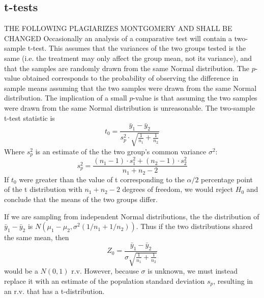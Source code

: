\documentclass[11pt,a4paper,article]{memoir} %
\begin{document}
\subsection*{t-tests}
THE FOLLOWING PLAGIARIZES MONTGOMERY AND SHALL BE CHANGED
Occasionally an analysis of a comparative test will contain a two-sample t-test. This assumes that the variances of the two groups tested is the same (i.e. the treatment may only affect the group mean, not its variance), and that the samples are randomly drawn from the same Normal distribution. The $p$-value obtained corresponds to the probability of observing the difference in sample means assuming that the two samples were drawn from the same Normal distribution. The implication of a small $p$-value is that assuming the two samples were drawn from the same Normal distribution is unreasonable. The two-sample t-test statistic is
\[
	t_0 = \frac{\bar{y}_1 - \bar{y}_2}{s_p^2 \cdot \sqrt{\frac{1}{n_1} + \frac{1}{n_2}}}
\]
Where $s_p^2$ is an estimate of the the two group's common variance $\sigma^2$:
\[
	s_p^2 = \frac{(n_1	 - 1)\cdot s_1^2 + (n_2 - 1)\cdot s_2^2}{n_1 + n_2 - 2}	
\]
If $t_0$ were greater than the value of t corresponding to the $\alpha/2$ percentage point of the t distribution with $n_1 + n_2 - 2$ degrees of freedom, we would reject $H_0$ and conclude that the means of the two groups differ.
\par
If we are sampling from independent Normal distributions, the the distribution of $\bar{y}_1 - \bar{y}_2$ is $N(\mu_1 - \mu_2, \sigma^2(1/n_1 + 1/n_2))$. Thus if the two distributions shared the same mean, then
\[
	Z_0 = \frac{\bar{y}_1 - \bar{y}_2}{\sigma\sqrt{\frac{1}{n_1} + \frac{1}{n_2}}}
\]
would be a $N(0, 1)$ r.v. However, because $\sigma$ is unknown, we must instead replace it with an estimate of the population standard deviation $s_p$, resulting in an r.v. that has a t-distribution.
\newpage
\end{document}

